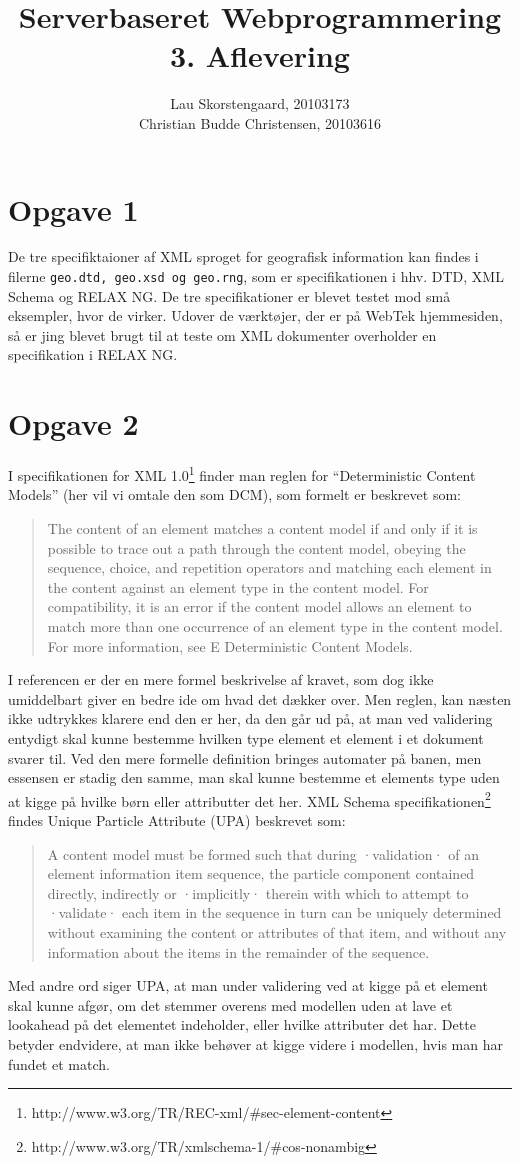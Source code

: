 \documentclass[a4paper,10pt]{article}
\author{Lau Skorstengaard, 20103173 \\Christian Budde Christensen, 20103616}
\title{Serverbaseret Webprogrammering\\3. Aflevering}
\begin{document}
\maketitle
\section*{Opgave 1}
De tre specifiktaioner af XML sproget for geografisk information kan findes i filerne \texttt{geo.dtd, geo.xsd og geo.rng}, som er specifikationen i hhv. DTD, XML Schema og RELAX NG. De tre specifikationer er blevet testet mod små eksempler, hvor de virker. Udover de værktøjer, der er på WebTek hjemmesiden, så er jing blevet brugt til at teste om XML dokumenter overholder en specifikation i RELAX NG.

\section*{Opgave 2}
I specifikationen for XML 1.0\footnote{http://www.w3.org/TR/REC-xml/\#sec-element-content} finder man reglen for ``Deterministic Content Models'' (her vil vi omtale den som DCM), som formelt er beskrevet som:
\begin{quotation}
The content of an element matches a content model if and only if it is possible to trace out a path through the content model, obeying the sequence, choice, and repetition operators and matching each element in the content against an element type in the content model. For compatibility, it is an error if the content model allows an element to match more than one occurrence of an element type in the content model. For more information, see E Deterministic Content Models.
\end{quotation}
I referencen er der en mere formel beskrivelse af kravet, som dog ikke umiddelbart giver en bedre ide om hvad det dækker over. Men reglen, kan næsten ikke udtrykkes klarere end den er her, da den går ud på, at man ved validering entydigt skal kunne bestemme hvilken type element et element i et dokument svarer til. Ved den mere formelle definition bringes automater på banen, men essensen er stadig den samme, man skal kunne bestemme et elements type uden at kigge på hvilke børn eller attributter det her.  XML Schema specifikationen\footnote{http://www.w3.org/TR/xmlschema-1/\#cos-nonambig} findes Unique Particle Attribute (UPA) beskrevet som:
\begin{quotation}
A content model must be formed such that during ·validation· of an element information item sequence, the particle component contained directly, indirectly or ·implicitly· therein with which to attempt to ·validate· each item in the sequence in turn can be uniquely determined without examining the content or attributes of that item, and without any information about the items in the remainder of the sequence.
\end{quotation}
Med andre ord siger UPA, at man under validering ved at kigge på et element skal kunne afgør, om det stemmer overens med modellen uden at lave et lookahead på det elementet indeholder, eller hvilke attributer det har. Dette betyder endvidere, at man ikke behøver at kigge videre i modellen, hvis man har fundet et match.
\end{document}

